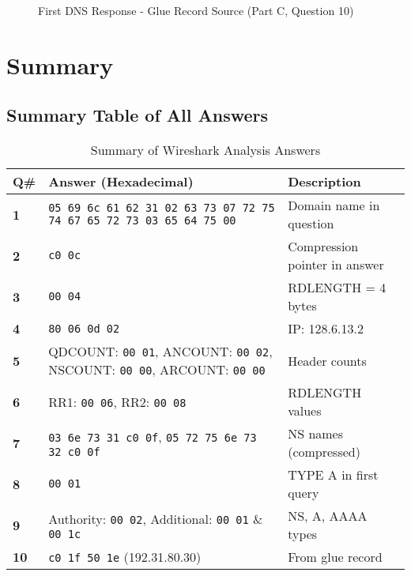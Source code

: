 \documentclass[11pt,letterpaper]{article}
\begin{document}
\begin{figure}[h]
    \centering
    \caption{First DNS Response - Glue Record Source (Part C, Question 10)}
    \label{fig:partc_q10b}
\end{figure}

\newpage

\section{Summary}

\subsection{Summary Table of All Answers}

\begin{table}[h]
\centering
\small
\begin{tabular}{|p{1cm}|p{8cm}|p{4cm}|}
\hline
\textbf{Q\#} & \textbf{Answer (Hexadecimal)} & \textbf{Description} \\
\hline
\textbf{1} & \texttt{05 69 6c 61 62 31 02 63 73 07 72 75 74 67 65 72 73 03 65 64 75 00} & Domain name in question \\
\hline
\textbf{2} & \texttt{c0 0c} & Compression pointer in answer \\
\hline
\textbf{3} & \texttt{00 04} & RDLENGTH = 4 bytes \\
\hline
\textbf{4} & \texttt{80 06 0d 02} & IP: 128.6.13.2 \\
\hline
\textbf{5} & QDCOUNT: \texttt{00 01}, ANCOUNT: \texttt{00 02}, NSCOUNT: \texttt{00 00}, ARCOUNT: \texttt{00 00} & Header counts \\
\hline
\textbf{6} & RR1: \texttt{00 06}, RR2: \texttt{00 08} & RDLENGTH values \\
\hline
\textbf{7} & \texttt{03 6e 73 31 c0 0f}, \texttt{05 72 75 6e 73 32 c0 0f} & NS names (compressed) \\
\hline
\textbf{8} & \texttt{00 01} & TYPE A in first query \\
\hline
\textbf{9} & Authority: \texttt{00 02}, Additional: \texttt{00 01} \& \texttt{00 1c} & NS, A, AAAA types \\
\hline
\textbf{10} & \texttt{c0 1f 50 1e} (192.31.80.30) & From glue record \\
\hline
\end{tabular}
\caption{Summary of Wireshark Analysis Answers}
\label{tab:summary}
\end{table}
\end{document}
